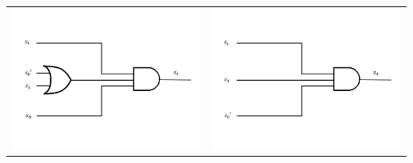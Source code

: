 \documentclass{article}
\begin{document}
\begin{table}[h!]
\begin{tabular}{ c c }
\centering
\includegraphics[scale=0.3]{z1} &
\includegraphics[scale=0.3]{z0} \\
\end{tabular}
\end{table}
\end{document}
